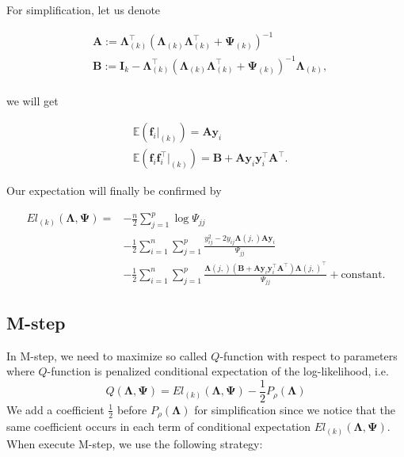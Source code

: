 \documentclass[
  a4paper,
  oneside,
  openany,
  12pt,
  onecolumn]{book}
\theoremstyle{plain}
\theoremstyle{remark}
\begin{document}
For simplification, let us denote

\[
\begin{align*}
&\boldsymbol{A}:=\boldsymbol{\Lambda}_{(k)}^\top(\boldsymbol{\Lambda}_{(k)}\boldsymbol{\Lambda}_{(k)}^\top+\boldsymbol{\Psi}_{(k)})^{-1}\\
&\boldsymbol{B}:=\boldsymbol{I}_k-\boldsymbol{\Lambda}_{(k)}^\top(\boldsymbol{\Lambda}_{(k)}\boldsymbol{\Lambda}_{(k)}^\top+\boldsymbol{\Psi}_{(k)})^{-1}\boldsymbol{\Lambda}_{(k)},\\
\end{align*} 
\]

we will get

\[
\begin{align*}
&\mathbb{E}(\boldsymbol{f}_i|_{(k)})= \boldsymbol{A}\boldsymbol{y}_i\\
&\mathbb{E}(\boldsymbol{f}_i\boldsymbol{f}_i^\top|_{(k)})= \boldsymbol{B}+\boldsymbol{A}\boldsymbol{y}_i\boldsymbol{y}_i^\top\boldsymbol{A}^\top.
\end{align*}
\]

Our expectation will finally be confirmed by

\[
\begin{align*}
El_{(k)}(\boldsymbol{\Lambda},\boldsymbol{\Psi})= & -\frac{n}{2}\sum_{j=1}^p\log{\Psi_{jj}}\\
& -\frac{1}{2}\sum_{i=1}^n\sum_{j=1}^p\frac{y_{ij}^2-2y_{ij}\boldsymbol{\Lambda}(j,)\boldsymbol{A}\boldsymbol{y}_i}{\Psi_{jj}}\\
& -\frac{1}{2}\sum_{i=1}^n\sum_{j=1}^p\frac{\boldsymbol{\Lambda}(j,)(\boldsymbol{B}+\boldsymbol{A}\boldsymbol{y}_i\boldsymbol{y}_i^\top\boldsymbol{A}^\top)\boldsymbol{\Lambda}(j,)^\top}{\Psi_{jj}}+\text{constant}.
\end{align*}
\]

\subsection{M-step}\label{m-step}

In M-step, we need to maximize so called \(Q\)-function with respect to
parameters where \(Q\)-function is penalized conditional expectation of
the log-likelihood, i.e. \[
Q(\boldsymbol{\Lambda},\boldsymbol{\Psi}) = El_{(k)}(\boldsymbol{\Lambda},\boldsymbol{\Psi}) - \frac{1}{2}P_{\rho}(\boldsymbol{\Lambda})
\] We add a coefficient \(\frac{1}{2}\) before
\(P_{\rho}(\boldsymbol{\Lambda})\) for simplification since we notice
that the same coefficient occurs in each term of conditional expectation
\(El_{(k)}(\boldsymbol{\Lambda},\boldsymbol{\Psi})\). When execute
M-step, we use the following strategy\citep{Ng2012EMAlgorithm}:
\end{document}
